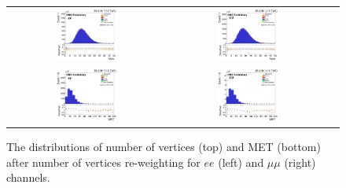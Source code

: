 \begin{figure}[ht]
  \begin{center}
    \begin{tabular}{ccc}
      \includegraphics[width=0.4\textwidth]{figures/tW/fig/Step1/ee_Nvtx/H_pv_n.png}&
      \includegraphics[width=0.4\textwidth]{figures/tW/fig/Step1/mumu_Nvtx/H_pv_n.png}\\
      \includegraphics[width=0.4\textwidth]{figures/tW/fig/Step1/ee_Nvtx/H_MET_Et.png}&
      \includegraphics[width=0.4\textwidth]{figures/tW/fig/Step1/mumu_Nvtx/H_MET_Et.png}\\
    \end{tabular}
    \caption{The distributions of number of vertices (top) and MET (bottom) after number of vertices re-weighting for $ee$ (left) and $\mu\mu$ (right) channels.
    \label{fig:step1_Nvtx_reweight}}
  \end{center}
\end{figure}



